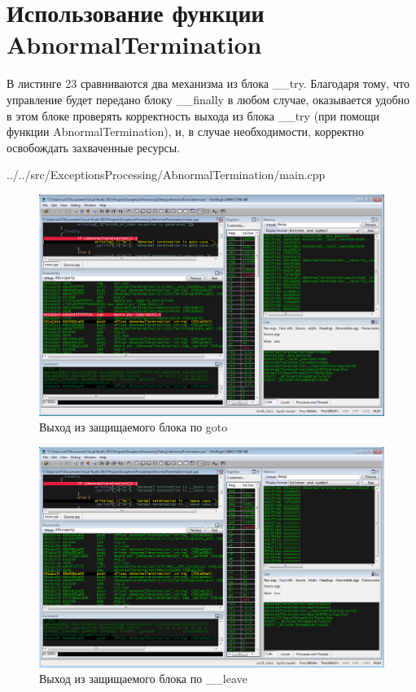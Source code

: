 \documentclass[a4paper, 12pt]{report}		%
\begin{document}
\chapter*{Использование функции AbnormalTermination}

В листинге 23 сравниваются два механизма из блока \_\_try. Благодаря тому, что управление будет передано блоку \_\_finally в любом случае, оказывается удобно в этом блоке проверять корректность выхода из блока \_\_try (при помощи функции AbnormalTermination), и, в случае необходимости, корректно освобождать захваченные ресурсы.


{../../src/ExceptionsProcessing/AbnormalTermination/main.cpp}

\begin{figure}[h!]
\centering
\includegraphics[scale=0.50]{res/014}
\caption{Выход из защищаемого блока по goto}
\end{figure}

\begin{figure}[h!]
\centering
\includegraphics[scale=0.50]{res/015}
\caption{Выход из защищаемого блока по \_\_leave}
\end{figure}
\end{document}
